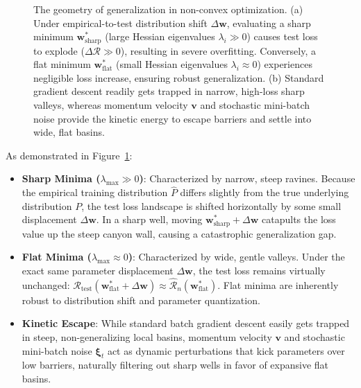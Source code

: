 \begin{figure}[H]
{%
}
\caption{The geometry of generalization in non-convex optimization. (a) Under empirical-to-test distribution shift $\Delta \mathbf{w}$, evaluating a sharp minimum $\mathbf{w}^*_{\mathrm{sharp}}$ (large Hessian eigenvalues $\lambda_i \gg 0$) causes test loss to explode ($\Delta \mathcal{R} \gg 0$), resulting in severe overfitting. Conversely, a flat minimum $\mathbf{w}^*_{\mathrm{flat}}$ (small Hessian eigenvalues $\lambda_i \approx 0$) experiences negligible loss increase, ensuring robust generalization. (b) Standard gradient descent readily gets trapped in narrow, high-loss sharp valleys, whereas momentum velocity $\mathbf{v}$ and stochastic mini-batch noise provide the kinetic energy to escape barriers and settle into wide, flat basins.}
\label{fig:flat_vs_sharp_minima}
\end{figure}

As demonstrated in Figure~\ref{fig:flat_vs_sharp_minima}:
\begin{itemize}
  \item \textbf{Sharp Minima ($\lambda_{\max} \gg 0$)}: Characterized by narrow, steep ravines. Because the empirical training distribution $\hat{P}$ differs slightly from the true underlying distribution $P$, the test loss landscape is shifted horizontally by some small displacement $\Delta \mathbf{w}$. In a sharp well, moving $\mathbf{w}^*_{\text{sharp}} + \Delta \mathbf{w}$ catapults the loss value up the steep canyon wall, causing a catastrophic generalization gap.
  \item \textbf{Flat Minima ($\lambda_{\max} \approx 0$)}: Characterized by wide, gentle valleys. Under the exact same parameter displacement $\Delta \mathbf{w}$, the test loss remains virtually unchanged: $\mathcal{R}_{\text{test}}(\mathbf{w}^*_{\text{flat}} + \Delta \mathbf{w}) \approx \hat{\mathcal{R}}_n(\mathbf{w}^*_{\text{flat}})$. Flat minima are inherently robust to distribution shift and parameter quantization.
  \item \textbf{Kinetic Escape}: While standard batch gradient descent easily gets trapped in steep, non-generalizing local basins, momentum velocity $\mathbf{v}$ and stochastic mini-batch noise $\boldsymbol{\xi}_t$ act as dynamic perturbations that kick parameters over low barriers, naturally filtering out sharp wells in favor of expansive flat basins.
\end{itemize}

